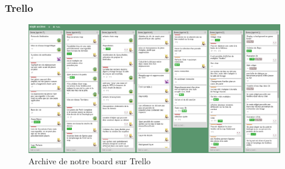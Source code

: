 \subsubsection{Trello}


\begin{figure}[h!]
	\centering
	\includegraphics[width=1\textwidth]{img/trello_archive.png}
	\caption{Archive de notre board sur Trello}
	\label{fig:notification}
\end{figure}